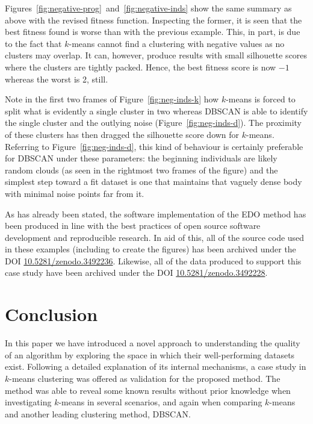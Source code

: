 Figures~\ref{fig:negative-prog}~and~\ref{fig:negative-inds} show the same
summary as above with the revised fitness function. Inspecting the former, it is
seen that the best fitness found is worse than with the previous example. This,
in part, is due to the fact that \(k\)-means cannot find a clustering with
negative values as no clusters may overlap. It can, however, produce results
with small silhouette scores where the clusters are tightly packed. Hence, the
best fitness score is now \(-1\) whereas the worst is 2, still.

Note in the first two frames of Figure~\ref{fig:neg-inds-k} how \(k\)-means is
forced to split what is evidently a single cluster in two whereas DBSCAN is able
to identify the single cluster and the outlying noise
(Figure~\ref{fig:neg-inds-d}). The proximity of these clusters has then dragged
the silhouette score down for \(k\)-means. Referring to
Figure~\ref{fig:neg-inds-d}, this kind of behaviour is certainly preferable for
DBSCAN under these parameters: the beginning individuals are likely random
clouds (as seen in the rightmost two frames of the figure) and the simplest step
toward a fit dataset is one that maintains that vaguely dense body with minimal
noise points far from it.

As has already been stated, the software implementation of the EDO method
has been produced in line with the best practices of open source software
development and reproducible research. In aid of this, all of the source code
used in these examples (including to create the figures) has been archived
under the DOI
\href{https://doi.org/10.5281/zenodo.3492236}{10.5281/zenodo.3492236}.
Likewise, all of the data produced to support this case study have been archived
under the DOI
\href{https://doi.org/10.5281/zenodo.3492228}{10.5281/zenodo.3492228}.


\section{Conclusion}

In this paper we have introduced a novel approach to understanding the quality
of an algorithm by exploring the space in which their well-performing datasets
exist. Following a detailed explanation of its internal mechanisms, a case study
in \(k\)-means clustering was offered as validation for the proposed method.
The method was able to reveal some known results without prior knowledge when
investigating \(k\)-means in several scenarios, and again when comparing
\(k\)-means and another leading clustering method, DBSCAN.\


